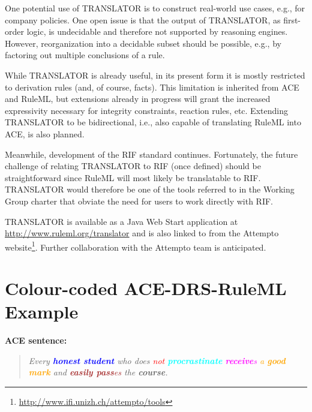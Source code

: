 \documentclass[12pt]{report}
\begin{document}
One potential use of TRANSLATOR is to construct real-world use cases, e.g., for company policies. One open issue is that the output of TRANSLATOR, as first-order logic, is undecidable and therefore not supported by reasoning engines. However, reorganization into a decidable subset should be possible, e.g., by factoring out multiple conclusions of a rule.

While TRANSLATOR is already useful, in its present form it is mostly restricted to derivation rules (and, of course, facts). This limitation is inherited from ACE and RuleML, but extensions already in progress will grant the increased expressivity necessary for integrity constraints, reaction rules, etc. Extending TRANSLATOR to be bidirectional, i.e., also capable of translating RuleML into ACE, is also planned.

Meanwhile, development of the RIF standard continues. Fortunately, the future challenge of relating TRANSLATOR to RIF (once defined) should be straightforward since RuleML will most likely be translatable to RIF. TRANSLATOR would therefore be one of the tools referred to in the Working Group charter that obviate the need for users to work directly with RIF.

TRANSLATOR is available as a Java Web Start application at \url{http://www.ruleml.org/translator} and is also linked to from the Attempto website\footnote{\url{http://www.ifi.unizh.ch/attempto/tools}}. Further collaboration with the Attempto team is anticipated.




\appendix

\chapter{Colour-coded ACE-DRS-RuleML Example}
\newpage
\textbf{ACE sentence:}\begin{quote}
\textit{\textcolor{turq}{Every} \textbf{\textcolor{blue}{honest student}} who does \textcolor{red}{not} \textbf{\textcolor{cyan}{procrastinate}} \textcolor{magenta}{\textbf{receive}s} \textcolor{orange}{a \textbf{good mark}} and \textcolor{brown}{\textbf{easily pass}es} \textcolor{peach}{the \textbf{course}}.}\end{quote}
\end{document}
